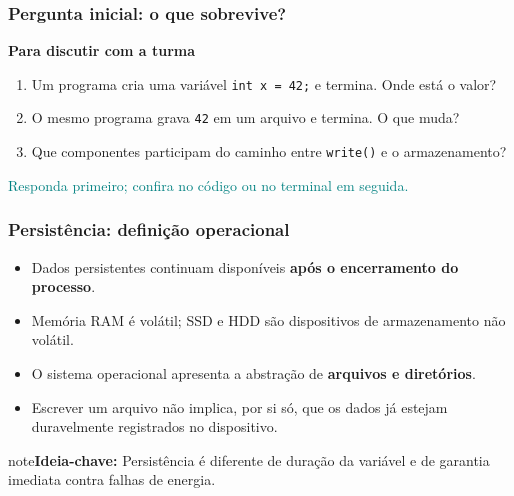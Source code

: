\documentclass[aspectratio=169,11pt]{beamer}
\begin{document}
\begin{frame}
\frametitle{Pergunta inicial: o que sobrevive?}
{\large\textbf{Para discutir com a turma}}\par\medskip\begin{enumerate}\item Um programa cria uma variável \texttt{int x = 42;} e termina. Onde está o valor?
\item O mesmo programa grava \texttt{42} em um arquivo e termina. O que muda?
\item Que componentes participam do caminho entre \texttt{write()} e o armazenamento?
\end{enumerate}\vfill\textcolor{teal}{\footnotesize Responda primeiro; confira no código ou no terminal em seguida.}
\end{frame}

\begin{frame}
\frametitle{Persistência: definição operacional}
\large
\begin{itemize}
\item Dados persistentes continuam disponíveis \textbf{após o encerramento do processo}.
\item Memória RAM é volátil; SSD e HDD são dispositivos de armazenamento não volátil.
\item O sistema operacional apresenta a abstração de \textbf{arquivos e diretórios}.
\item Escrever um arquivo não implica, por si só, que os dados já estejam duravelmente registrados no dispositivo.
\end{itemize}
\vfill\begin{beamercolorbox}[wd=\textwidth,sep=2mm,rounded=true]{note}\small\textbf{Ideia-chave:} Persistência é diferente de duração da variável e de garantia imediata contra falhas de energia.\end{beamercolorbox}
\end{frame}
\end{document}
